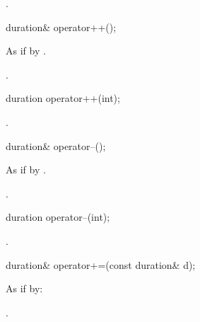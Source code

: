 \begin{itemdescr}
\pnum
\returns {}.
\end{itemdescr}

%
%
\begin{itemdecl}
duration& operator++();
\end{itemdecl}

\begin{itemdescr}
\pnum
\effects As if by .

\pnum
\returns {}.
\end{itemdescr}

%
%
\begin{itemdecl}
duration operator++(int);
\end{itemdecl}

\begin{itemdescr}
\pnum
\returns {}.
\end{itemdescr}

%
%
\begin{itemdecl}
duration& operator--();
\end{itemdecl}

\begin{itemdescr}
\pnum
\effects As if by .

\pnum
\returns {}.
\end{itemdescr}

%
%
\begin{itemdecl}
duration operator--(int);
\end{itemdecl}

\begin{itemdescr}
\pnum
\returns {}.
\end{itemdescr}

%
%
\begin{itemdecl}
duration& operator+=(const duration& d);
\end{itemdecl}

\begin{itemdescr}
\pnum
\effects As if by: 

\pnum
\returns {}.
\end{itemdescr}

